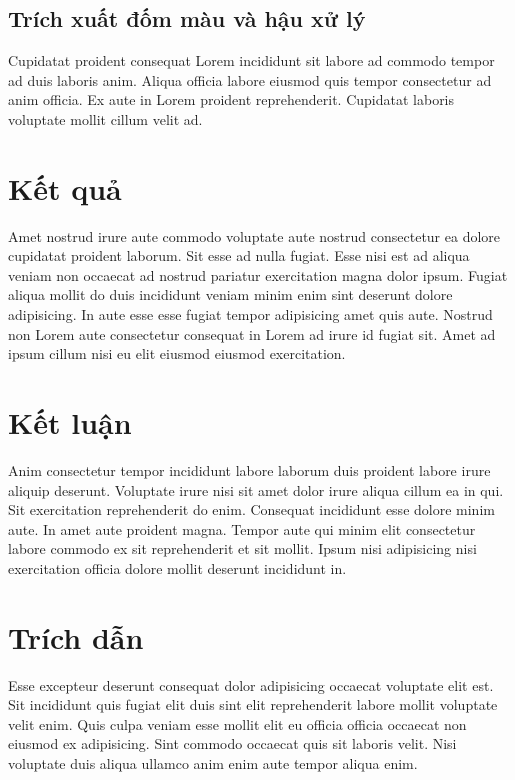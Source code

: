 \documentclass[a4paper]{article}
\begin{document}
\subsection{Trích xuất đốm màu và hậu xử lý}
Cupidatat proident consequat Lorem incididunt sit labore ad commodo tempor ad duis laboris anim. Aliqua officia labore eiusmod quis tempor consectetur ad anim officia. Ex aute in Lorem proident reprehenderit. Cupidatat laboris voluptate mollit cillum velit ad.

\section{Kết quả}
Amet nostrud irure aute commodo voluptate aute nostrud consectetur ea dolore cupidatat proident laborum. Sit esse ad nulla fugiat. Esse nisi est ad aliqua veniam non occaecat ad nostrud pariatur exercitation magna dolor ipsum. Fugiat aliqua mollit do duis incididunt veniam minim enim sint deserunt dolore adipisicing. In aute esse esse fugiat tempor adipisicing amet quis aute. Nostrud non Lorem aute consectetur consequat in Lorem ad irure id fugiat sit. Amet ad ipsum cillum nisi eu elit eiusmod eiusmod exercitation.

\section{Kết luận}
Anim consectetur tempor incididunt labore laborum duis proident labore irure aliquip deserunt. Voluptate irure nisi sit amet dolor irure aliqua cillum ea in qui. Sit exercitation reprehenderit do enim. Consequat incididunt esse dolore minim aute. In amet aute proident magna. Tempor aute qui minim elit consectetur labore commodo ex sit reprehenderit et sit mollit. Ipsum nisi adipisicing nisi exercitation officia dolore mollit deserunt incididunt in.

\section*{Trích dẫn}
Esse excepteur deserunt consequat dolor adipisicing occaecat voluptate elit est. Sit incididunt quis fugiat elit duis sint elit reprehenderit labore mollit voluptate velit enim. Quis culpa veniam esse mollit elit eu officia officia occaecat non eiusmod ex adipisicing. Sint commodo occaecat quis sit laboris velit. Nisi voluptate duis aliqua ullamco anim enim aute tempor aliqua enim.
\end{document}
